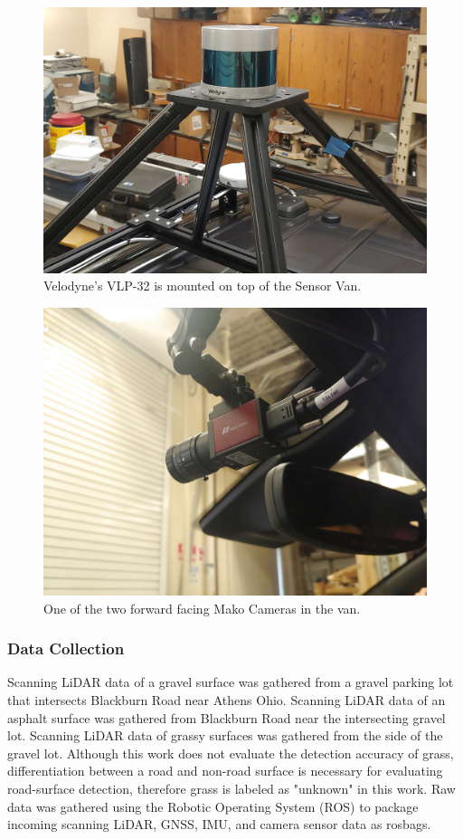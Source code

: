 \documentclass[numbered,pdftex]{ohio-etd}
\begin{document}
{{{{				\begin{figure}[H]
					\centering
					\includegraphics[width=0.7\linewidth]{Defense_Images/vlp_32_mount_2}
					\caption[VLP 32 on Van]{Velodyne's VLP-32 is mounted on top of the Sensor Van.}
					\label{fig:vlp32mount}
				\end{figure}
				
				\begin{figure}[H]
					\centering
					\includegraphics[width=0.7\linewidth]{Defense_Images/Mako_Camera}
					\caption[Mako Camera]{One of the two forward facing Mako Cameras in the van.}
					\label{fig:makocamera}
				\end{figure}
			
			} %
			
			\subsubsection{Data Collection}{
				
				{Scanning LiDAR data of a gravel surface was gathered from a gravel parking lot that intersects Blackburn Road near Athens Ohio. Scanning LiDAR data of an asphalt surface was gathered from Blackburn Road near the intersecting gravel lot. Scanning LiDAR data of grassy surfaces was gathered from the side of the gravel lot. Although this work does not evaluate the detection accuracy of grass, differentiation between a road and non-road surface is necessary for evaluating road-surface detection, therefore grass is labeled as "unknown" in this work. Raw data was gathered using the Robotic Operating System (ROS) to package incoming scanning LiDAR, GNSS, IMU, and camera sensor data as rosbags.}
				
}}}}
\end{document}
